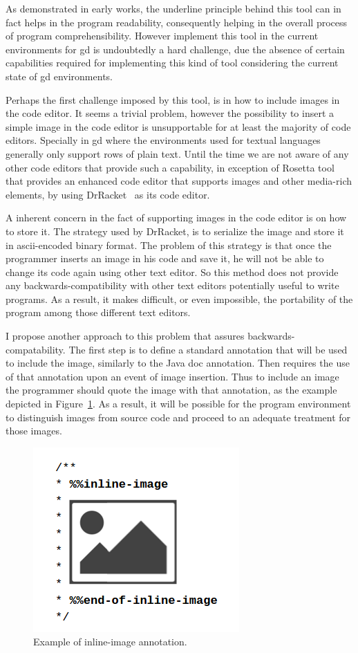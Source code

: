 As demonstrated in early works, the underline principle behind this tool can in fact helps in the program readability, consequently helping in the overall process of program comprehensibility. However implement this tool in the current environments for \gls{gd} is undoubtedly a hard  challenge, due the absence of certain capabilities required for implementing this kind of tool considering the current state of \gls{gd} environments.

Perhaps the first challenge imposed by this tool, is in how to include images in the code editor. It seems a trivial problem, however the possibility to insert a simple image in the code editor is unsupportable for at least the majority of code editors. Specially in \gls{gd} where the environments used for textual languages generally only support rows of plain text. Until the time we are not aware of any other code editors that provide such a capability, in exception of Rosetta tool~\citep{lopes2011portable} that provides an enhanced code editor that supports images and other media-rich elements, by using DrRacket~\citep{findler2002drscheme} as its code editor.

A inherent concern in the fact of supporting images in the code editor is on how to store it. The strategy used by DrRacket, is to serialize the image and store it in ascii-encoded binary format. The problem of this strategy is that once the programmer inserts an image in his code and save it, he will not be able to change its code again using other text editor. So this method does not provide any backwards-compatibility with other text editors potentially useful to write programs. As a result, it makes difficult, or even impossible, the portability of the program among those different text editors.

I propose another approach to this problem that assures backwards-compatability. The first step is to define a standard annotation that will be used to include the image, similarly to the Java doc annotation. Then requires the use of that annotation upon an event of image insertion. Thus to include an image the programmer should quote the image with that annotation, as the example depicted in Figure~\ref{fig:inline-image}. As a result, it will be possible for the program environment to distinguish images from source code and proceed to an adequate treatment for those images. 

\begin{figure}[!htbp]
  \centering
  \includegraphics[width=.25\textwidth]{images/inline-image-example}
    \caption{Example of inline-image annotation.}
  \label{fig:inline-image}
\end{figure}

